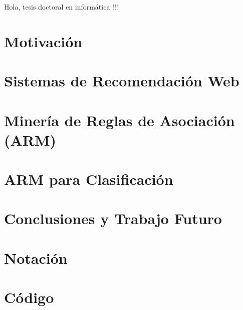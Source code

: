 \documentclass[utf8]{book}
\begin{document}



Hola, tesis doctoral en informática !!!
\newpage

%


%
\tableofcontents

\chapter*{Motivación}
\label{chap:motivacion}





\chapter[SRW]{Sistemas de Recomendación Web}
\label{chap:SRW}





\chapter[ARM]{Minería de Reglas de Asociación (ARM)}
\label{chap:arm}





\chapter{ARM para Clasificación}
\label{chap:clasificacion}





\chapter{Conclusiones y Trabajo Futuro}
\label{chap:conclusiones-y-trabajo-futuro}




\appendix
\chapter{Notación}
\label{apdx:notacion}


\chapter{Código}
\label{apdx:codigo}

\end{document}
